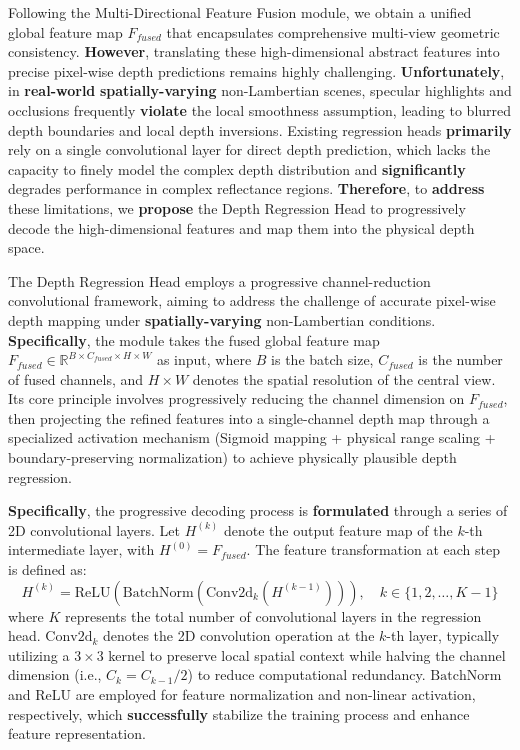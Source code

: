 Following the Multi-Directional Feature Fusion module, we obtain a unified global feature map $F_{fused}$ that encapsulates comprehensive multi-view geometric consistency. \textbf{However}, translating these high-dimensional abstract features into precise pixel-wise depth predictions remains highly challenging. \textbf{Unfortunately}, in \textbf{real-world} \textbf{spatially-varying} non-Lambertian scenes, specular highlights and occlusions frequently \textbf{violate} the local smoothness assumption, leading to blurred depth boundaries and local depth inversions. Existing regression heads \textbf{primarily} rely on a single convolutional layer for direct depth prediction, which lacks the capacity to finely model the complex depth distribution and \textbf{significantly} degrades performance in complex reflectance regions. \textbf{Therefore}, to \textbf{address} these limitations, we \textbf{propose} the Depth Regression Head to progressively decode the high-dimensional features and map them into the physical depth space.

The Depth Regression Head employs a progressive channel-reduction convolutional framework, aiming to address the challenge of accurate pixel-wise depth mapping under \textbf{spatially-varying} non-Lambertian conditions. \textbf{Specifically}, the module takes the fused global feature map $F_{fused} \in \mathbb{R}^{B \times C_{fused} \times H \times W}$ as input, where $B$ is the batch size, $C_{fused}$ is the number of fused channels, and $H \times W$ denotes the spatial resolution of the central view. Its core principle involves progressively reducing the channel dimension on $F_{fused}$, then projecting the refined features into a single-channel depth map through a specialized activation mechanism (Sigmoid mapping + physical range scaling + boundary-preserving normalization) to achieve physically plausible depth regression.

\textbf{Specifically}, the progressive decoding process is \textbf{formulated} through a series of 2D convolutional layers. Let $H^{(k)}$ denote the output feature map of the $k$-th intermediate layer, with $H^{(0)} = F_{fused}$. The feature transformation at each step is defined as:
\[
\begin{equation}
H^{(k)} = \text{ReLU}(\text{BatchNorm}(\text{Conv2d}_{k}(H^{(k-1)}))), \quad k \in \{1, 2, \dots, K-1\}
\end{equation}
\]
where $K$ represents the total number of convolutional layers in the regression head. $\text{Conv2d}_{k}$ denotes the 2D convolution operation at the $k$-th layer, typically utilizing a $3 \times 3$ kernel to preserve local spatial context while halving the channel dimension (i.e., $C_{k} = C_{k-1}/2$) to reduce computational redundancy. $\text{BatchNorm}$ and $\text{ReLU}$ are employed for feature normalization and non-linear activation, respectively, which \textbf{successfully} stabilize the training process and enhance feature representation.

